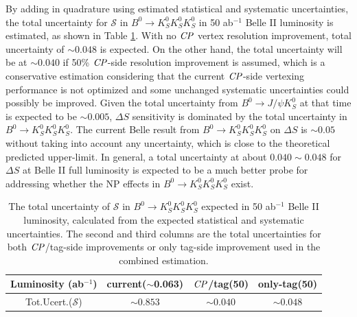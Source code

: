 By adding in quadrature using estimated statistical and systematic uncertainties, the total uncertainty for $\mathcal{S}$ in $B^0 \to K_S^0  K_S^0  K_S^0$ in 50 ab$^{-1}$ Belle II luminosity is estimated, as shown in Table \ref{tab:err_full}. With no $\it{CP}$ vertex resolution improvement, total uncertainty of $\sim 0.048$ is expected. On the other hand, the total uncertainty will be at $\sim 0.040$ if 50\% $\it{CP}$-side resolution improvement is assumed, which is a conservative estimation considering that the current $\it{CP}$-side vertexing performance is not optimized and some unchanged systematic uncertainties could possibly be improved. Given the total uncertainty from $B^0\to J/\psi K_S^0$ at that time is expected to be $\sim 0.005$\cite{b2book}, $\Delta S$ sensitivity is dominated by the total uncertainty in $B^0 \to K_S^0  K_S^0  K_S^0$. The current Belle result from $B^0 \to K_S^0  K_S^0  K_S^0$ on $\Delta S$ is $\sim0.05$ without taking into account any uncertainty, which is close to the theoretical predicted upper-limit. In general, a total uncertainty at about $0.040\sim 0.048$ for $\Delta S$ at Belle II full luminosity is expected to be a much better probe for addressing whether the NP effects in $B^0 \to K_S^0  K_S^0  K_S^0$ exist.

\begin{table}[htpb]
	\centering
	\caption{The total uncertainty of $\mathcal{S}$ in $B^0 \to K_S^0  K_S^0  K_S^0$ expected in 50 ab$^{-1}$ Belle II luminosity, calculated from the expected statistical and systematic uncertainties. The second and third columns are the total uncertainties for both $\it{CP}$/tag-side improvements or only tag-side improvement used in the combined estimation.}
	\label{tab:err_full}
	\begin{tabular}{c|c|c |c}
		\hline
		Luminosity (ab$^{-1}$) & current($\sim$0.063)&$\it{CP}$/tag(50) & only-tag(50)\\
		\hline
		Tot.Ucert.($\mathcal{S}$) & $\sim0.853$ & $\sim0.040$ & $\sim0.048$ \\
		\hline
	\end{tabular}
\end{table}

